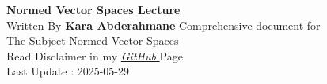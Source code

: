 \documentclass{report}
\begin{document}
\begin{titlepage}
   \begin{center}
       \vspace*{1cm}
       \textbf{Normed Vector Spaces Lecture} \\
       \vspace{0.5cm} 
       Written By \textbf{Kara Abderahmane}
       \vspace{1.5cm}
       \vfill
       Comprehensive document for \\
       The Subject Normed Vector Spaces \\
       Read Disclaimer in my 
       \href{https://github.com/Kapa9102/nvs-lecture}{\it GitHub \normalfont}  Page  \\
       \vspace{0.8cm}
       Last Update : 2025-05-29
   \end{center}
\end{titlepage}

\tableofcontents



























\end{document}
